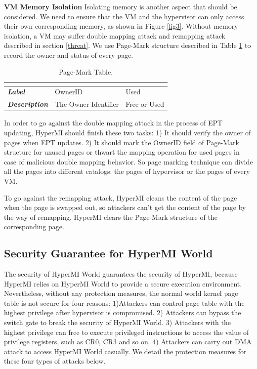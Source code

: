 \documentclass[conference]{IEEEtran}
\begin{document}
\textbf{VM Memory Isolation}
Isolating memory is another aspect that should be considered. We need to ensure that the VM and the hypervisor can only access their own corresponding memory, as shown in Figure \ref{fig3}.
Without memory isolation, a VM may suffer double mapping attack and remapping attack described in section \ref{threat}. We use Page-Mark structure described in Table \ref{tab2} to record the owner and status of every page. 

\begin{table}
\centering
\caption{Page-Mark Table.}\label{tab2}
\begin{tabular}{p{1.2cm}|p{1.4cm}|p{1.5cm}}
\hline
\multicolumn{3}{c}{\bfseries\textbf\centering{Page-Mark Table}}\\
\hline
{\itshape\bfseries Label} & OwnerID & Used \\
\hline
{\itshape\bfseries Description} & The Owner Identifier & Free or Used \\
\hline
\end{tabular}
\end{table}

In order to go against the double mapping attack in the process of EPT updating, HyperMI should finish these two tasks: 1) It should verify the owner of pages when EPT updates. 2) It should mark the OwnerID field of Page-Mark structure for unused pages or thwart the mapping operation for used pages in case of malicious double mapping behavior. So page marking technique can divide all the pages into different catalogs: the pages of hypervisor or the pages of every VM.

To go against the remapping attack, HyperMI cleans the content of the page when the page is swapped out, so attackers can't get the content of the page by the way of remapping. HyperMI clears the Page-Mark structure of the corresponding page. 





\subsection{Security Guarantee for HyperMI World}\label {SG}
The security of HyperMI World guarantees the security of HyperMI, because HyperMI relies on HyperMI World to provide a secure execution environment.
Nevertheless, without any protection measures, the normal world kernel page table is not secure for four reasons: 1)Attackers can control page table with the highest privilege after hypervisor is compromised. 2) Attackers can bypass the switch gate to break the security of HyperMI World. 3) Attackers with the highest privilege can free to execute privileged instructions to access the value of privilege registers, such as CR0, CR3 and so on. 4) Attackers can carry out DMA attack to access HyperMI World casually.
We detail the protection measures for these four types of attacks below.
\end{document}
